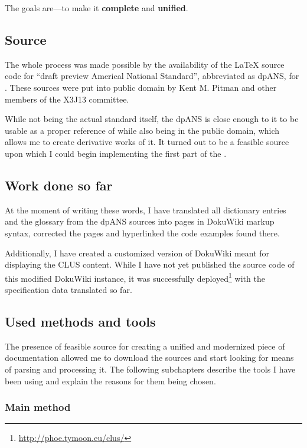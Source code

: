 The goals are---to make it \textbf{complete} and \textbf{unified}.

\subsection{Source}

The whole process was made possible by the availability of the \LaTeX{} source code for ``draft preview Americal National Standard'', abbreviated as dpANS, for \cl{}. These sources were put into public domain by Kent M. Pitman and other members of the X3J13 committee.

While not being the actual standard itself, the dpANS is close enough to it to be usable as a proper reference of \cl{} while also being in the public domain, which allows me to create derivative works of it. It turned out to be a feasible source upon which I could begin implementing the first part of the \us{}.

\subsection{Work done so far}

At the moment of writing these words, I have translated all dictionary entries and the glossary from the dpANS sources into pages in Doku\-Wiki markup syntax, corrected the pages and hyperlinked the code examples found there.

Additionally, I have created a customized version of Doku\-Wiki meant for displaying the CLUS content. While I have not yet published the source code of this modified Doku\-Wiki instance, it was successfully deployed\footnote{\url{http://phoe.tymoon.eu/clus/}} with the specification data translated so far.

\subsection{Used methods and tools}

The presence of feasible source for creating a unified and modernized piece of \cl{} documentation allowed me to download the sources and start looking for means of parsing and processing it. The following subchapters describe the tools I have been using and explain the reasons for them being chosen.

\subsubsection{Main method}

